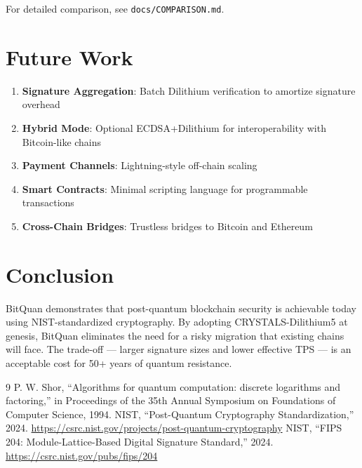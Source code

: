 \documentclass[11pt,a4paper]{article}
\begin{document}
For detailed comparison, see \texttt{docs/COMPARISON.md}.

\section{Future Work}

\begin{enumerate}[leftmargin=*]
    \item \textbf{Signature Aggregation}: Batch Dilithium verification to amortize signature overhead
    \item \textbf{Hybrid Mode}: Optional ECDSA+Dilithium for interoperability with Bitcoin-like chains
    \item \textbf{Payment Channels}: Lightning-style off-chain scaling
    \item \textbf{Smart Contracts}: Minimal scripting language for programmable transactions
    \item \textbf{Cross-Chain Bridges}: Trustless bridges to Bitcoin and Ethereum
\end{enumerate}

\section{Conclusion}

BitQuan demonstrates that post-quantum blockchain security is achievable today using NIST-standardized cryptography. By adopting CRYSTALS-Dilithium5 at genesis, BitQuan eliminates the need for a risky migration that existing chains will face. The trade-off — larger signature sizes and lower effective TPS — is an acceptable cost for 50+ years of quantum resistance.

\begin{thebibliography}{9}
 P. W. Shor, ``Algorithms for quantum computation: discrete logarithms and factoring,'' in Proceedings of the 35th Annual Symposium on Foundations of Computer Science, 1994.
 NIST, ``Post-Quantum Cryptography Standardization,'' 2024. \url{https://csrc.nist.gov/projects/post-quantum-cryptography}
 NIST, ``FIPS 204: Module-Lattice-Based Digital Signature Standard,'' 2024. \url{https://csrc.nist.gov/pubs/fips/204}
\end{thebibliography}
\end{document}
